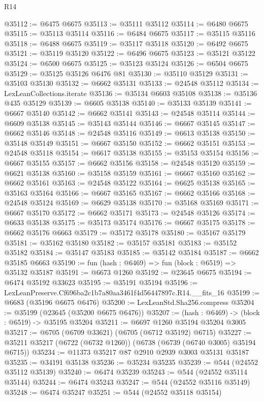 \begin{lexlean}{R14}
\begin{coremodule}
@35112 := @6475 @6675
@35113 := @35111 @35112
@35114 := @6480 @6675
@35115 := @35113 @35114
@35116 := @6484 @6675
@35117 := @35115 @35116
@35118 := @6488 @6675
@35119 := @35117 @35118
@35120 := @6492 @6675
@35121 := @35119 @35120
@35122 := @6496 @6675
@35123 := @35121 @35122
@35124 := @6500 @6675
@35125 := @35123 @35124
@35126 := @6504 @6675
@35129 := @35125 @35126 @6476 @81
@35130 := @35110 @35129
@35131 := @35103 @35130
@35132 := @6662 @35131
@35133 := @24548 @35112
@35134 := LexLeanCollections.iterate
@35136 := @35134 @6603 @35108
@35138 := @35136 @435 @35129
@35139 := @6605 @35138
@35140 := @35133 @35139
@35141 := @6667 @35140
@35142 := @6662 @35141
@35143 := @24548 @35114
@35144 := @6609 @35138
@35145 := @35143 @35144
@35146 := @6667 @35145
@35147 := @6662 @35146
@35148 := @24548 @35116
@35149 := @6613 @35138
@35150 := @35148 @35149
@35151 := @6667 @35150
@35152 := @6662 @35151
@35153 := @24548 @35118
@35154 := @6617 @35138
@35155 := @35153 @35154
@35156 := @6667 @35155
@35157 := @6662 @35156
@35158 := @24548 @35120
@35159 := @6621 @35138
@35160 := @35158 @35159
@35161 := @6667 @35160
@35162 := @6662 @35161
@35163 := @24548 @35122
@35164 := @6625 @35138
@35165 := @35163 @35164
@35166 := @6667 @35165
@35167 := @6662 @35166
@35168 := @24548 @35124
@35169 := @6629 @35138
@35170 := @35168 @35169
@35171 := @6667 @35170
@35172 := @6662 @35171
@35173 := @24548 @35126
@35174 := @6633 @35138
@35175 := @35173 @35174
@35176 := @6667 @35175
@35178 := @6662 @35176 @6663
@35179 := @35172 @35178
@35180 := @35167 @35179
@35181 := @35162 @35180
@35182 := @35157 @35181
@35183 := @35152 @35182
@35184 := @35147 @35183
@35185 := @35142 @35184
@35187 := @6662 @35185 @6663
@35190 := fun (hash : @6469) => fun (block : @6519) => @35132 @35187
@35191 := @6673 @1260
@35192 := @23645 @6675
@35194 := @6474 @35192 @33623
@35195 := @35191 @35194
@35196 := LexLeanPreserve.Cf696ba2c1b7a80aa3461f4d56447897c.R14.__fits_16
@35199 := @6683 (@35196 @6675 @6476)
@35200 := LexLeanStd.Sha256.compress
@35204 := @35199 (@23645 (@35200 @6675 @6476))
@35207 := (hash : @6469) -> (block : @6519) -> @35195 @35204
@35211 := @6697 @1260 @35194 @35204 @3005
@35217 := @6705 (@6709 @33621) (@6705 (@6712 @35192) @6715)
@35227 := @35211 @35217 (@6722 (@6732 @1260)) (@6738 (@6739 (@6740 @3005) @35194 @6715))
@35234 := @11373 @35217 @87 @2910 @2939 @3003 @35131 @35187
@35235 := @34191 @35138
@35236 := @35234 @35235
@35239 := @544 (@24552 @35112 @35139)
@35240 := @6474 @35239
@35243 := @544 (@24552 @35114 @35144)
@35244 := @6474 @35243
@35247 := @544 (@24552 @35116 @35149)
@35248 := @6474 @35247
@35251 := @544 (@24552 @35118 @35154)

\end{coremodule}
\end{lexlean}
